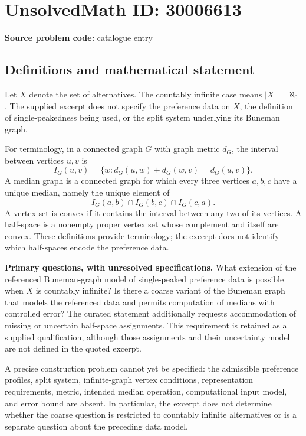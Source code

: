 \documentclass[11pt]{article}
\begin{document}
\section*{UnsolvedMath ID: 30006613}
\textbf{Source problem code:} catalogue entry
\subsection{Definitions and mathematical statement}
Let \(X\) denote the set of alternatives. The countably infinite case means \(|X|=\aleph_0\). The supplied excerpt does not specify the preference data on \(X\), the definition of single-peakedness being used, or the split system underlying its Buneman graph.

For terminology, in a connected graph \(G\) with graph metric \(d_G\), the interval between vertices \(u,v\) is
\[
I_G(u,v)=\{w:d_G(u,w)+d_G(w,v)=d_G(u,v)\}.
\]
A median graph is a connected graph for which every three vertices \(a,b,c\) have a unique median, namely the unique element of
\[
I_G(a,b)\cap I_G(b,c)\cap I_G(c,a).
\]
A vertex set is convex if it contains the interval between any two of its vertices. A half-space is a nonempty proper vertex set whose complement and itself are convex. These definitions provide terminology; the excerpt does not identify which half-spaces encode the preference data.

\textbf{Primary questions, with unresolved specifications.} What extension of the referenced Buneman-graph model of single-peaked preference data is possible when \(X\) is countably infinite? Is there a coarse variant of the Buneman graph that models the referenced data and permits computation of medians with controlled error? The curated statement additionally requests accommodation of missing or uncertain half-space assignments. This requirement is retained as a supplied qualification, although those assignments and their uncertainty model are not defined in the quoted excerpt.

A precise construction problem cannot yet be specified: the admissible preference profiles, split system, infinite-graph vertex conditions, representation requirements, metric, intended median operation, computational input model, and error bound are absent. In particular, the excerpt does not determine whether the coarse question is restricted to countably infinite alternatives or is a separate question about the preceding data model.
\end{document}
